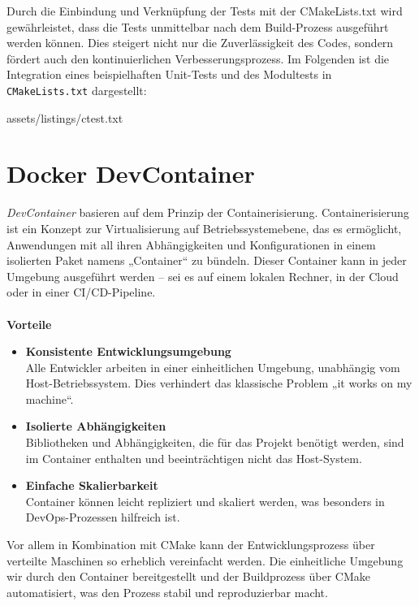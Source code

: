 Durch die Einbindung und Verknüpfung der Tests mit der CMakeLists.txt wird gewährleistet, dass die Tests unmittelbar nach dem Build-Prozess ausgeführt werden können.
Dies steigert nicht nur die Zuverlässigkeit des Codes, sondern fördert auch den kontinuierlichen Verbesserungsprozess.
Im Folgenden ist die Integration eines beispielhaften Unit-Tests und des Modultests in \texttt{CMakeLists.txt} dargestellt:

{assets/listings/ctest.txt}

\section{Docker DevContainer}
\label{sec:tooling-docker}
\textit{DevContainer} basieren auf dem Prinzip der Containerisierung.
Containerisierung ist ein Konzept zur Virtualisierung auf Betriebssystemebene, das es ermöglicht, Anwendungen mit all ihren Abhängigkeiten und Konfigurationen in einem isolierten Paket namens „Container“ zu bündeln.
Dieser Container kann in jeder Umgebung ausgeführt werden – sei es auf einem lokalen Rechner, in der Cloud oder in einer CI/CD-Pipeline. \cite{Docker2024}\\\\
\textbf{Vorteile}
\begin{itemize}
    \item \textbf{Konsistente Entwicklungsumgebung}\\
    Alle Entwickler arbeiten in einer einheitlichen Umgebung, unabhängig vom Host-Betriebssystem.
    Dies verhindert das klassische Problem „it works on my machine“.
    \item \textbf{Isolierte Abhängigkeiten}\\
    Bibliotheken und Abhängigkeiten, die für das Projekt benötigt werden, sind im Container enthalten und beeinträchtigen nicht das Host-System.
    \item \textbf{Einfache Skalierbarkeit}\\
    Container können leicht repliziert und skaliert werden, was besonders in DevOps-Prozessen hilfreich ist.
\end{itemize}
Vor allem in Kombination mit CMake kann der Entwicklungsprozess über verteilte Maschinen so erheblich vereinfacht werden.
Die einheitliche Umgebung wir durch den Container bereitgestellt und der Buildprozess über CMake automatisiert, was den Prozess stabil und reproduzierbar macht.
\newpage
